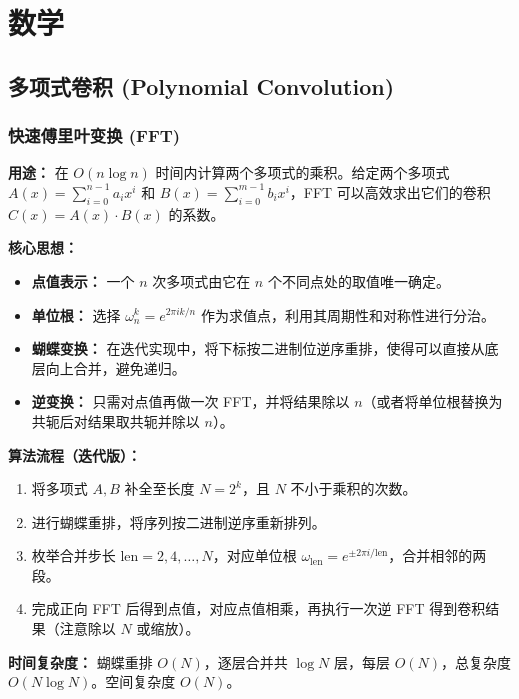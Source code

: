 \section{数学}

\subsection{多项式卷积 (Polynomial Convolution)}

\subsubsection{快速傅里叶变换 (FFT)}

\textbf{用途：}  
在 $O(n\log n)$ 时间内计算两个多项式的乘积。给定两个多项式 $A(x)=\sum_{i=0}^{n-1}a_ix^i$ 和 $B(x)=\sum_{i=0}^{m-1}b_ix^i$，FFT 可以高效求出它们的卷积 $C(x)=A(x)\cdot B(x)$ 的系数。

\textbf{核心思想：}
\begin{itemize}
    \item \textbf{点值表示：} 一个 $n$ 次多项式由它在 $n$ 个不同点处的取值唯一确定。
    \item \textbf{单位根：} 选择 $\omega_n^k = e^{2\pi i k/n}$ 作为求值点，利用其周期性和对称性进行分治。
    \item \textbf{蝴蝶变换：} 在迭代实现中，将下标按二进制位逆序重排，使得可以直接从底层向上合并，避免递归。
    \item \textbf{逆变换：} 只需对点值再做一次 FFT，并将结果除以 $n$（或者将单位根替换为共轭后对结果取共轭并除以 $n$）。
\end{itemize}

\textbf{算法流程（迭代版）：}
\begin{enumerate}
    \item 将多项式 $A,B$ 补全至长度 $N=2^k$，且 $N$ 不小于乘积的次数。
    \item 进行蝴蝶重排，将序列按二进制逆序重新排列。
    \item 枚举合并步长 $\text{len}=2,4,\dots,N$，对应单位根 $\omega_{\text{len}}=e^{\pm 2\pi i/\text{len}}$，合并相邻的两段。
    \item 完成正向 FFT 后得到点值，对应点值相乘，再执行一次逆 FFT 得到卷积结果（注意除以 $N$ 或缩放）。
\end{enumerate}

\textbf{时间复杂度：} 蝴蝶重排 $O(N)$，逐层合并共 $\log N$ 层，每层 $O(N)$，总复杂度 $O(N\log N)$。空间复杂度 $O(N)$。



